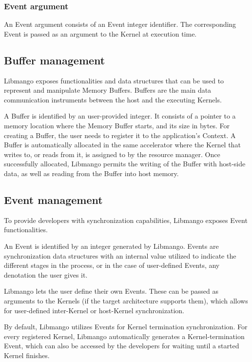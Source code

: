 \subsubsection{Event argument}
An Event argument consists of an Event integer identifier. The corresponding Event is passed as an argument to the Kernel at execution time.


\subsection{Buffer management}
Libmango exposes functionalities and data structures that can be used to represent and manipulate Memory Buffers. Buffers are the main data communication instruments between the host and the executing Kernels. 

A Buffer is identified by an user-provided integer. It consists of a pointer to a memory location where the Memory Buffer starts, and its size in bytes. 
For creating a Buffer, the user needs to register it to the application's Context. A Buffer is automatically allocated in the same accelerator where the Kernel that writes to, or reads from it, is assigned to by the resource manager.
Once successfully allocated, Libmango permits the writing of the Buffer with host-side data, as well as reading from the Buffer into host memory.


\subsection{Event management}
To provide developers with synchronization capabilities, Libmango exposes Event functionalities.

An Event is identified by an integer generated by Libmango. Events are synchronization data structures with an internal value utilized to indicate the different stages in the process, or in the case of user-defined Events, any denotation the user gives it.

Libmango lets the user define their own Events. These can be passed as arguments to the Kernels (if the target architecture supports them), which allows for user-defined inter-Kernel or host-Kernel synchronization.

By default, Libmango utilizes Events for Kernel termination synchronization. For every registered Kernel, Libmango automatically generates a Kernel-termination Event, which can also be accessed by the developers for waiting until a started Kernel finishes.

